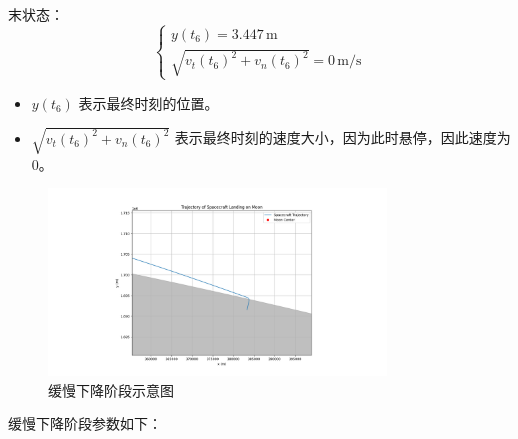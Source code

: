 \documentclass{ctexart}
\begin{document}
末状态：
\begin{equation}
\begin{cases}
y(t_6) = 3.447 \, \text{m} \\
\sqrt{v_t(t_6)^2 + v_n(t_6)^2} = 0 \, \text{m/s}
\end{cases}
\end{equation}

\begin{itemize}
\renewcommand\labelitemi{} %
\item $y(t_6)$ 表示最终时刻的位置。
\item $\sqrt{v_t(t_6)^2 + v_n(t_6)^2}$ 表示最终时刻的速度大小，因为此时悬停，因此速度为0。
\end{itemize}

    \begin{figure}[H] %
        \centering %
        \includegraphics[width=0.8\textwidth]{"./picture/stage5.png"} %
        \caption{缓慢下降阶段示意图} %
        \label{fig:example} %
    \end{figure}

缓慢下降阶段参数如下：

\begin{center}
\end{center}
\end{document}
